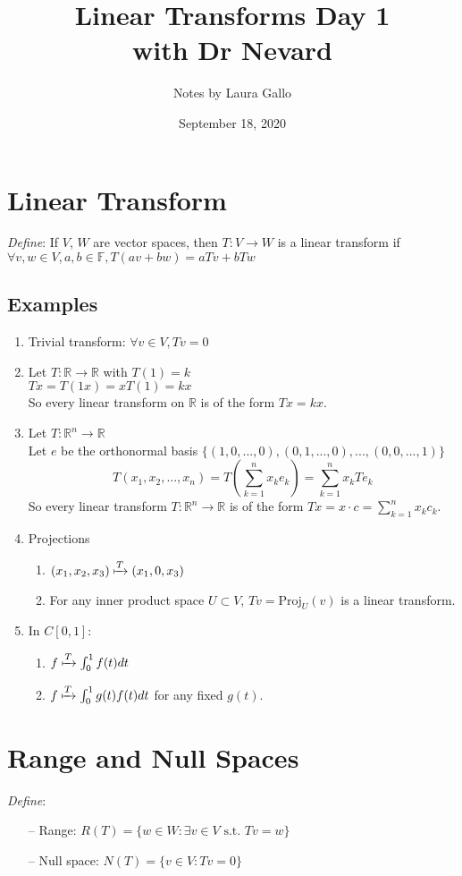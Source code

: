 \documentclass{article}
\title{Linear Transforms Day 1 \\ with Dr Nevard}
\author{Notes by Laura Gallo}
\date{September 18, 2020}
\begin{document}
\maketitle
\section{Linear Transform}
\emph{Define}: If $V$, $W$ are vector spaces, then $T: V\rightarrow W$ is a linear transform if $\forall v, w \in V, a, b \in \mathbb{F}, T(av+bw)=aTv+bTw$
\subsection{Examples}
\begin{enumerate}
	\item Trivial transform: $\forall v \in V, Tv=0$

	\item Let $T: \mathbb{R} \rightarrow \mathbb{R}$ with $T(1)=k$ \\
		$Tx=T(1x)=xT(1)=kx$ \\
		So every linear transform on $\mathbb{R}$ is of the form $Tx=kx$.

	\item Let $T: \mathbb{R}^n \rightarrow \mathbb{R}$ \\
		Let $e$ be the orthonormal basis $\{(1,0,...,0),(0,1,...,0),...,(0,0,...,1)\}$ \\
		$$T(x_1,x_2,...,x_n)=T(\sum_{k=1}^n x_ke_k)=\sum_{k=1}^nx_kTe_k$$
		So every linear transform $T:\mathbb{R}^n \rightarrow \mathbb{R}$ is of the form $Tx=x \cdot c =\sum_{k=1}^nx_kc_k$.

	\item Projections
	\begin{enumerate}
		\item $(x_1, x_2, x_3) \xmapsto{T} (x_1, 0, x_3)$
		\item For any inner product space $U \subset V$, $Tv=\text{Proj}_U(v)$ is a linear transform.
	\end{enumerate}

	\item In $C[0,1]$:
	\begin{enumerate}
		\item $f \xmapsto{T} \int_0^1 f(t)dt$
		\item $f \xmapsto{T} \int_0^1 g(t)f(t)dt$ for any fixed $g(t)$.
	\end{enumerate}
\end{enumerate}

\section{Range and Null Spaces}
\emph{Define}:
\begin{itemize}
	\item[--] Range: $R(T)=\{w \in W : \exists v \in V \text{ s.t. } Tv=w\}$
	\item[--] Null space: $N(T)=\{v \in V : Tv=0\}$
\end{itemize}
\end{document}
